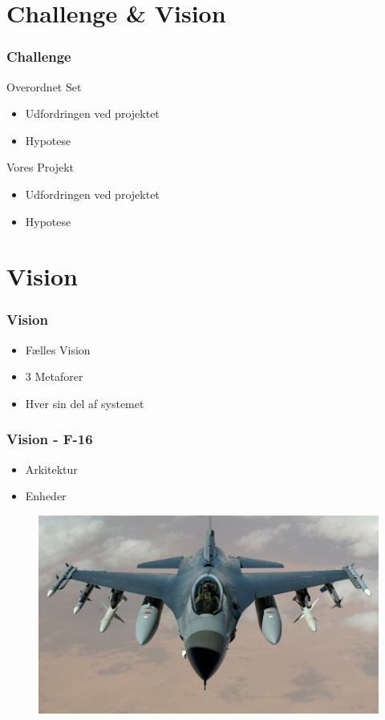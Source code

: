 \section{Challenge \& Vision}
\begin{frame}
\frametitle{Challenge}
Overordnet Set
\begin{itemize}
	\item Udfordringen ved projektet
	\item Hypotese
\end{itemize}
Vores Projekt
\begin{itemize}
	\item Udfordringen ved projektet
	\item Hypotese
\end{itemize}
\end{frame}

\section{Vision}

\begin{frame}
\frametitle{Vision}
\begin{itemize}
	\item Fælles Vision
	\item 3 Metaforer
	\item Hver sin del af systemet
\end{itemize}
\end{frame}

\begin{frame}
\frametitle{Vision - F-16}
\begin{itemize}
	\item Arkitektur
	\item Enheder
\end{itemize}
\begin{figure}
	\includegraphics[scale=0.3]{graphics/F16}
\end{figure}
\end{frame}

